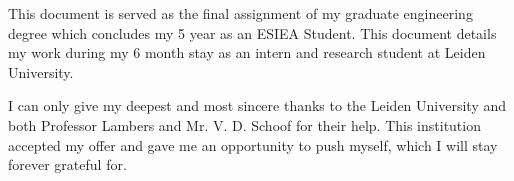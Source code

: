 This document is served as the final assignment of my graduate engineering degree which concludes my 5 year as an ESIEA Student.  This document details my work during my 6 month stay as an intern and research student at Leiden University. 

I can only give my deepest and most sincere thanks to the Leiden University and both Professor Lambers and Mr. V. D. Schoof for their help. This institution accepted my offer and gave me an opportunity to push myself, which I will stay forever grateful for. 


